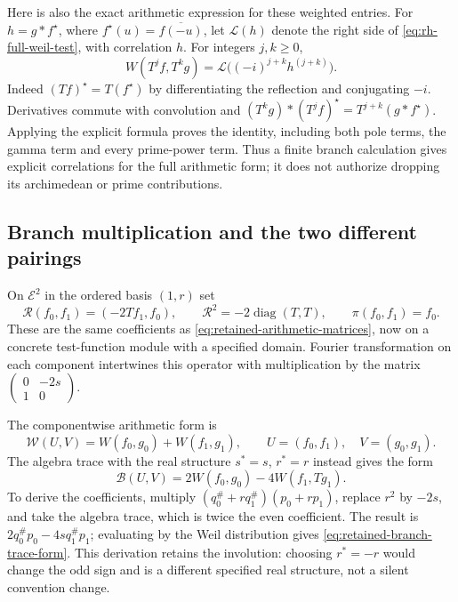 Here is also the exact arithmetic expression for these weighted entries.
For $h=g*f^\star$, where $f^\star(u)=\overline{f(-u)}$, let
$\mathcal L(h)$ denote the right side of
\eqref{eq:rh-full-weil-test}, with correlation $h$.
For integers $j,k\ge0$,
\begin{equation}
 W(T^j f,T^k g)=\mathcal L\bigl((-i)^{j+k}h^{(j+k)}\bigr).
 \label{eq:retained-differentiated-correlation}
\end{equation}
Indeed $(Tf)^\star=T(f^\star)$ by differentiating the reflection
and conjugating $-i$. Derivatives commute with convolution and
$(T^k g)*(T^j f)^\star=T^{j+k}(g*f^\star)$.
Applying the explicit formula proves the identity, including both
pole terms, the gamma term and every prime-power term. Thus a finite
branch calculation gives explicit correlations for the full arithmetic
form; it does not authorize dropping its archimedean or prime contributions.

\subsection{Branch multiplication and the two different pairings}
On $\mathcal E^2$ in the ordered basis $(1,r)$ set
\begin{equation}
 \mathcal R(f_0,f_1)=(-2Tf_1,f_0),\qquad
 \mathcal R^2=-2\operatorname{diag}(T,T),\qquad
 \pi(f_0,f_1)=f_0.
 \label{eq:retained-test-root}
\end{equation}
These are the same coefficients as
\eqref{eq:retained-arithmetic-matrices}, now on a concrete test-function
module with a specified domain. Fourier transformation on each component
intertwines this operator with multiplication by the matrix
$\left(\begin{smallmatrix}0&-2s\\1&0\end{smallmatrix}\right)$.

The componentwise arithmetic form is
\[
 \mathcal W(U,V)=W(f_0,g_0)+W(f_1,g_1),\qquad
 U=(f_0,f_1),\quad V=(g_0,g_1).
\]
The algebra trace with the real structure $s^*=s$, $r^*=r$
instead gives the form
\begin{equation}
 \mathcal B(U,V)=2W(f_0,g_0)-4W(f_1,Tg_1).
 \label{eq:retained-branch-trace-form}
\end{equation}
To derive the coefficients, multiply
$(q_0^\#+r q_1^\#)(p_0+r p_1)$, replace $r^2$ by $-2s$, and
take the algebra trace, which is twice the even coefficient. The result
is $2q_0^\#p_0-4s q_1^\#p_1$; evaluating by the Weil distribution
gives \eqref{eq:retained-branch-trace-form}. This derivation retains
the involution: choosing $r^*=-r$ would change the odd sign and is
a different specified real structure, not a silent convention change.

